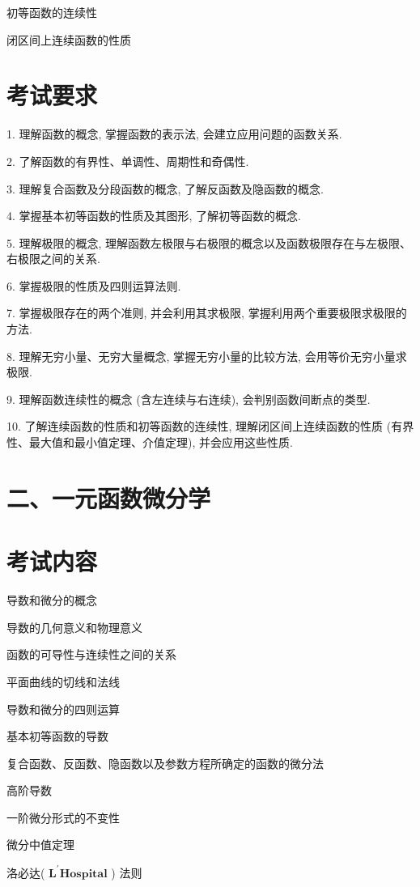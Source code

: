 \documentclass[10pt]{article}
\begin{document}
初等函数的连续性 

闭区间上连续函数的性质

\section*{考试要求}

1. 理解函数的概念, 掌握函数的表示法, 会建立应用问题的函数关系.

2. 了解函数的有界性、单调性、周期性和奇偶性.

3. 理解复合函数及分段函数的概念, 了解反函数及隐函数的概念.

4. 掌握基本初等函数的性质及其图形, 了解初等函数的概念.

5. 理解极限的概念, 理解函数左极限与右极限的概念以及函数极限存在与左极限、右极限之间的关系.

6. 掌握极限的性质及四则运算法则.

7. 掌握极限存在的两个准则, 并会利用其求极限, 掌握利用两个重要极限求极限的方法.

8. 理解无穷小量、无穷大量概念, 掌握无穷小量的比较方法, 会用等价无穷小量求极限.

9. 理解函数连续性的概念 (含左连续与右连续), 会判别函数间断点的类型.

10. 了解连续函数的性质和初等函数的连续性, 理解闭区间上连续函数的性质 (有界性、最大值和最小值定理、介值定理), 并会应用这些性质.

\section*{二、一元函数微分学}

\section*{考试内容}

导数和微分的概念 

导数的几何意义和物理意义 

函数的可导性与连续性之间的关系 

平面曲线的切线和法线 

导数和微分的四则运算 

基本初等函数的导数 

复合函数、反函数、隐函数以及参数方程所确定的函数的微分法 

高阶导数 

一阶微分形式的不变性 

微分中值定理 

洛必达( \(\mathbf{{L}^{\prime }{Hospital}}\) ) 法则 
\end{document}
